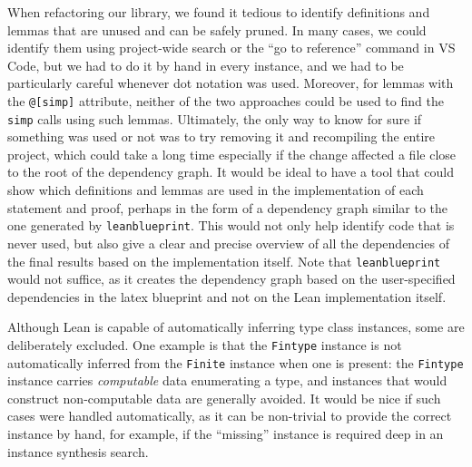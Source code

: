 When refactoring our library, we found it tedious to identify definitions and lemmas that are unused and can be safely pruned. In many cases, we could identify them using project-wide search or the ``go to reference'' command in VS Code, but we had to do it by hand in every instance, and we had to be particularly careful whenever dot notation was used. Moreover, for lemmas with the \texttt{@[simp]} attribute, neither of the two approaches could be used to find the \texttt{simp} calls using such lemmas. Ultimately, the only way to know for sure if something was used or not was to try removing it and recompiling the entire project, which could take a long time especially if the change affected a file close to the root of the dependency graph. It would be ideal to have a tool that could show which definitions and lemmas are used in the implementation of each statement and proof, perhaps in the form of a dependency graph similar to the one generated by \texttt{leanblueprint}. This would not only help identify code that is never used, but also give a clear and precise overview of all the dependencies of the final results based on the implementation itself. Note that \texttt{leanblueprint} would not suffice, as it creates the dependency graph based on the user-specified dependencies in the latex blueprint and not on the Lean implementation itself.

Although Lean is capable of automatically inferring type class instances, some are deliberately excluded. One example is that the \texttt{Fintype} instance is not automatically inferred from the \texttt{Finite} instance when one is present: the \texttt{Fintype} instance carries \emph{computable} data enumerating a type, and instances that would construct non-computable data are generally avoided. It would be nice if such cases were handled automatically, as it can be non-trivial to provide the correct instance by hand, for example, if the ``missing'' instance is required deep in an instance synthesis search. 

